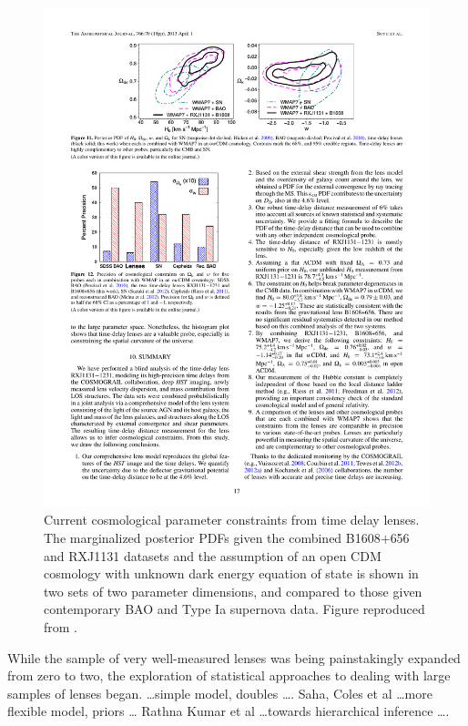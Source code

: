 \begin{figure}[!ht]
\centering\includegraphics[width=0.9\linewidth]{figures/Suyu13_fig11.pdf}
\caption{Current cosmological parameter constraints from time delay
lenses. The marginalized posterior PDFs given the combined B1608$+$656
and RXJ1131 datasets and the assumption of an open CDM cosmology with
unknown dark energy equation of state is shown in
two sets of two parameter dimensions,
and compared to those given contemporary BAO and Type Ia supernova data.
Figure reproduced from \citet{Suy++14}.}
\label{fig:current-constraints}
\end{figure}

While the sample of very well-measured lenses was being painstakingly
expanded from zero to two,  the exploration of statistical approaches to
dealing with large samples of lenses began. \citet{Oguri2007} \ldots simple model, doubles \ldots.
Saha, Coles et al \ldots more flexible model, priors \ldots
Rathna Kumar et al \ldots towards hierarchical inference \ldots.
